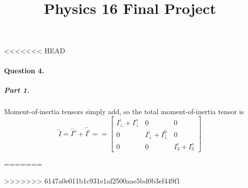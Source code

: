 <<<<<<< HEAD



\paragraph{Question 4.}

\subparagraph{Part 1.}  Moment-of-inertia tensors simply add, so the
total moment-of-inertia tensor is $$\overleftrightarrow{I}
= \overleftrightarrow{I^o} + \overleftrightarrow{I^i} =
= \begin{bmatrix}
I_\bot^i + I_\bot^o & 0 & 0 \\
0 & I_\bot^i + I_\bot^0 & 0 \\
0 & 0 & I_3^i + I_3^o
\end{bmatrix}$$


=======
\title{Physics 16 Final Project}


>>>>>>> 6147a0e011b1c931e1af2500aae5bd0b3ef449f1
